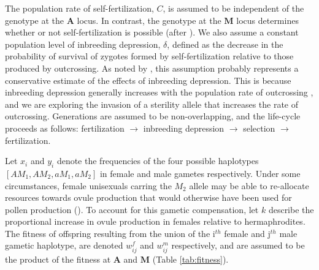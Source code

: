 \documentclass[9pt,twocolumn,twoside,lineno]{gsajnl}
\begin{document}
The population rate of self-fertilization, $C$, is assumed to be independent of the genotype at the $\mathbf{A}$ locus. In contrast, the genotype at the $\mathbf{M}$ locus determines whether or not self-fertilization is possible (after \citealt{Charlesworth1978}). We also assume a constant population level of inbreeding depression, $\delta$, defined as the decrease in the probability of survival of zygotes formed by self-fertilization relative to those produced by outcrossing. As noted by \citet{Charlesworth1978}, this assumption probably represents a conservative estimate of the effects of inbreeding depression. This is because inbreeding depression generally increases with the population rate of outcrossing \citep{Charlesworth2009}, and we are exploring the invasion of a sterility allele that increases the rate of outcrossing. Generations are assumed to be non-overlapping, and the life-cycle proceeds as follows: fertilization $\rightarrow$ inbreeding depression $\rightarrow$ selection $\rightarrow$ fertilization.

Let $x_i$ and $y_i$ denote the frequencies of the four possible haplotypes $[AM_1,AM_2,aM_1,aM_2]$ in female and male gametes respectively. Under some circumstances, female unisexuals carring the $M_2$ allele may be able to re-allocate resources towards ovule production that would otherwise have been used for pollen production (\citealt{Lloyd1975,Lloyd1976,Charlesworth1978}). To account for this gametic compensation, let $k$ describe the proportional increase in ovule production in females relative to hermaphrodites. The fitness of offspring resulting from the union of the i$^{th}$ female and j$^{th}$ male gametic haplotype, are denoted $w^f_{ij}$ and $w^m_{ij}$ respectively, and are assumed to be the product of the fitness at $\mathbf{A}$ and $\mathbf{M}$ (Table \ref{tab:fitness}).
\end{document}
